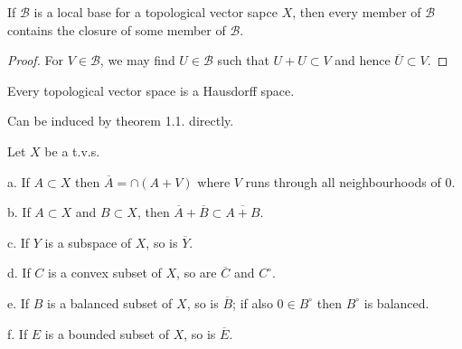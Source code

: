 \documentclass[lang=en, color=blue, ]{elegantbook}
\begin{document}
\begin{theorem}
    If $\mathscr{B}$ is a local base for a topological vector sapce $X$, then every member of $\mathscr{B}$ contains the closure of some member of $\mathscr{B}$.
\end{theorem}
\begin{proof}
    For $V\in \mathscr{B}$,  we may find $U\in \mathscr{B}$ such that $U+U\subset V$ and hence $\overline{U} \subset V$.
\end{proof}

\begin{theorem}
    Every topological vector space is a Hausdorff space.
\end{theorem}
Can be induced by theorem 1.1. directly.

\begin{theorem}
    Let $X$ be a t.v.s.\par
    a. If $A\subset X$ then $\overline{A} = \cap (A+V)$ where $V$ runs through all neighbourhoods of $0$.\par
    b. If $A\subset X$ and $B\subset X$, then $\overline{A} + \overline{B} \subset \overline{A+B}$.\par
    c. If $Y$ is a subspace of $X$, so is $\overline{Y}$.\par
    d. If $C$ is a convex subset of $X$, so are $\overline{C}$ and $C^{\circ}$.\par
    e. If $B$ is a balanced subset of $X$, so is $\overline{B}$; if also $0\in B^{\circ}$ then $B^{\circ}$ is balanced.\par
    f. If $E$ is a bounded subset of $X$, so is $\overline{E}$.
\end{theorem}
\end{document}
